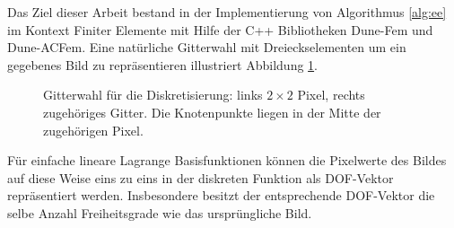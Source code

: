 \documentclass{mythesis}
\begin{document}
Das Ziel dieser Arbeit bestand in der Implementierung von Algorithmus \ref{alg:ee} im Kontext Finiter Elemente mit Hilfe der C++ Bibliotheken Dune-Fem und Dune-ACFem.
Eine natürliche Gitterwahl mit Dreieckselementen um ein gegebenes Bild zu repräsentieren illustriert Abbildung \ref{fig:grid}.
\begin{figure}[ht]
    \begin{subfigure}{0.5\textwidth}
	\centering
    \end{subfigure}%
    \begin{subfigure}{0.5\textwidth}
	\centering
    \end{subfigure}
    \caption{Gitterwahl für die Diskretisierung: links $2\times 2$ Pixel, rechts zugehöriges Gitter. Die Knotenpunkte liegen in der Mitte der zugehörigen Pixel.}
    \label{fig:grid}
\end{figure}
Für einfache lineare Lagrange Basisfunktionen können die Pixelwerte des Bildes auf diese Weise eins zu eins in der diskreten Funktion als DOF-Vektor repräsentiert werden.
Insbesondere besitzt der entsprechende DOF-Vektor die selbe Anzahl Freiheitsgrade wie das ursprüngliche Bild.
\end{document}
